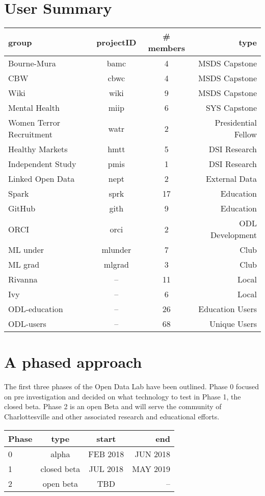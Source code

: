 \section{User Summary}
\begin{center}
\begin{tabular}{lccr}
\hline
\hline
group & projectID & \# members & type \\
\hline
\hline
Bourne-Mura & bamc & 4 & MSDS Capstone \\
CBW & cbwc & 4 & MSDS Capstone\\
Wiki & wiki & 9 & MSDS Capstone\\
Mental Health & miip & 6 & SYS Capstone\\
\hline
Women Terror Recruitment & watr & 2 & Presidential Fellow\\
\hline
Healthy Markets & hmtt & 5 & DSI Research\\
Independent Study & pmis & 1 & DSI Research\\
\hline
Linked Open Data   & nept & 2 & External Data\\
\hline
Spark & sprk & 17 & Education \\
GitHub & gith & 9 & Education \\
\hline
ORCI & orci & 2 & ODL Development\\
\hline
ML under & mlunder & 7 & Club\\
ML grad & mlgrad & 3 & Club\\
\hline
Rivanna & -- & 11 & Local\\
Ivy & -- & 6 & Local\\
\hline
\hline
ODL-education  & -- & 26 & Education Users\\
ODL-users & -- & 68 & Unique Users\\
\hline
\hline
\end{tabular}
\end{center}

\section{A phased approach}
The first three phases of the Open Data Lab have been outlined. Phase 0 focused on pre investigation and decided on what technology to test in Phase 1, the closed beta. Phase 2 is an open Beta and will serve the community of Charlottesville and other associated research and educational efforts.
\begin{center}
\begin{tabular}{lccr}
\hline
\hline
Phase & type & start & end \\
\hline
0 & alpha & FEB 2018 & JUN 2018\\
1 & closed beta & JUL 2018 & MAY 2019 \\
2 & open beta & TBD & -- \\
\hline
\hline
\end{tabular}
\end{center}

